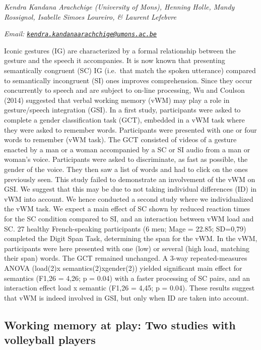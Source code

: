\documentclass[
  12pt,
]{book}
\begin{document}
\emph{Kendra Kandana Arachchige (University of Mons), Henning Holle, Mandy Rossignol, Isabelle Simoes Loureiro, \& Laurent Lefebvre}

\emph{Email: \href{mailto:kendra.kandanaarachchige@umons.ac.be}{\nolinkurl{kendra.kandanaarachchige@umons.ac.be}}}

Iconic gestures (IG) are characterized by a formal relationship between the gesture and the speech it accompanies. It is now known that presenting semantically congruent (SC) IG (i.e.~that match the spoken utterance) compared to semantically incongruent (SI) ones improves comprehension. Since they occur concurrently to speech and are subject to on-line processing, Wu and Coulson (2014) suggested that verbal working memory (vWM) may play a role in gesture/speech integration (GSI). In a first study, participants were asked to complete a gender classification task (GCT), embedded in a vWM task where they were asked to remember words. Participants were presented with one or four words to remember (vWM task). The GCT consisted of videos of a gesture enacted by a man or a woman accompanied by a SC or SI audio from a man or woman's voice. Participants were asked to discriminate, as fast as possible, the gender of the voice. They then saw a list of words and had to click on the ones previously seen. This study failed to demonstrate an involvement of the vWM on GSI. We suggest that this may be due to not taking individual differences (ID) in vWM into account. We hence conducted a second study where we individualized the vWM task. We expect a main effect of SC shown by reduced reaction times for the SC condition compared to SI, and an interaction between vWM load and SC. 27 healthy French-speaking participants (6 men; Mage = 22.85; SD=0,79) completed the Digit Span Task, determining the span for the vWM. In the vWM, participants were here presented with one (low) or several (high load, matching their span) words. The GCT remained unchanged. A 3-way repeated-measures ANOVA (load(2)x semantics(2)xgender(2)) yielded significant main effect for semantics (F1,26 = 4,26; p = 0.04) with a faster processing of SC pairs, and an interaction effect load x semantic (F1,26 = 4,45; p = 0.04). These results suggest that vWM is indeed involved in GSI, but only when ID are taken into account.

\hypertarget{working-memory-at-play-two-studies-with-volleyball-players}{%
\subsection{Working memory at play: Two studies with volleyball players}\label{working-memory-at-play-two-studies-with-volleyball-players}}
\end{document}
